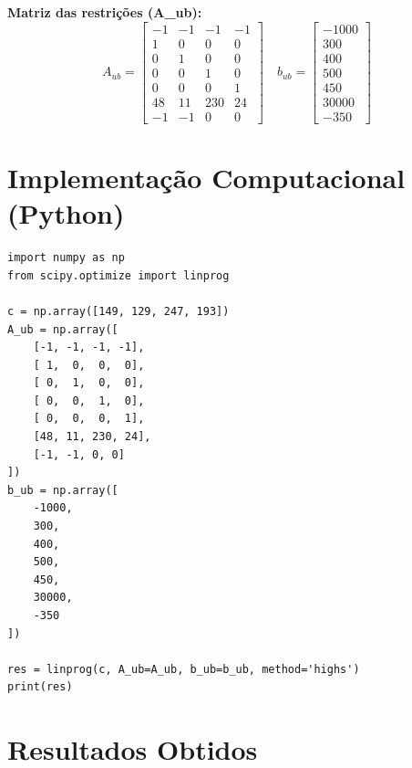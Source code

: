 \documentclass[12pt]{article}
\begin{document}
\textbf{Matriz das restrições (A\_ub):}
\[
A_{ub} =
\begin{bmatrix}
 -1 & -1 & -1 & -1 \\
  1 &  0 &  0 &  0 \\
  0 &  1 &  0 &  0 \\
  0 &  0 &  1 &  0 \\
  0 &  0 &  0 &  1 \\
 48 & 11 &230 & 24 \\
 -1 & -1 &  0 &  0
\end{bmatrix}
\quad
b_{ub} =
\begin{bmatrix}
-1000 \\ 300 \\ 400 \\ 500 \\ 450 \\ 30000 \\ -350
\end{bmatrix}
\]


\section*{Implementação Computacional (Python)}

\begin{verbatim}
import numpy as np
from scipy.optimize import linprog

c = np.array([149, 129, 247, 193])
A_ub = np.array([
    [-1, -1, -1, -1],
    [ 1,  0,  0,  0],
    [ 0,  1,  0,  0],
    [ 0,  0,  1,  0],
    [ 0,  0,  0,  1],
    [48, 11, 230, 24],
    [-1, -1, 0, 0]
])
b_ub = np.array([
    -1000,
    300,
    400,
    500,
    450,
    30000,
    -350
])

res = linprog(c, A_ub=A_ub, b_ub=b_ub, method='highs')
print(res)
\end{verbatim}

\section*{Resultados Obtidos}
\end{document}
